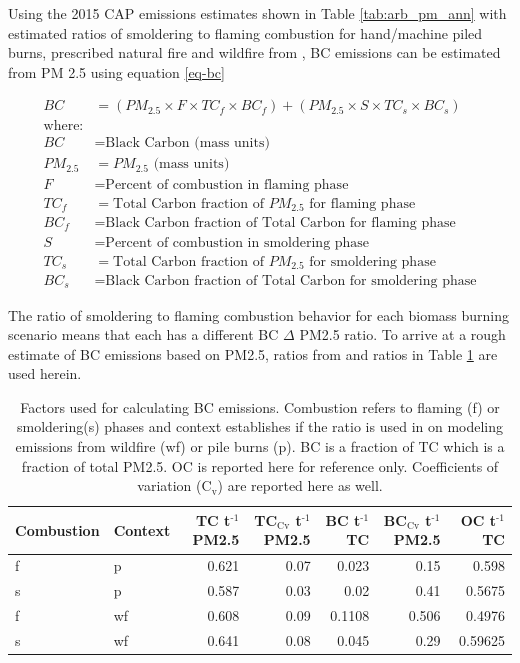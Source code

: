 \documentclass[a4paper]{article}
\begin{document}
Using the 2015 \ac{CAP} emissions estimates shown in Table \ref{tab:arb_pm_ann} with estimated ratios of smoldering to flaming combustion for hand/machine piled burns, prescribed natural fire and wildfire from \citet{Ward1989}, \ac{BC} emissions can be estimated from PM 2.5 using equation \eqref{eq-bc}


\begin{align}
BC &= \left( PM_{2.5} \times F \times TC_f \times BC_f\right) + \left( PM_{2.5} \times S \times TC_s \times BC_s\right) \label{eq-bc} \\
\text{where:} \nonumber \\
BC &= \text{Black Carbon (mass units)} \nonumber \\
PM_{2.5} &= PM_{2.5} \text{ (mass units)} \nonumber \\
F &= \text{Percent of combustion in flaming phase} \nonumber \\
TC_f &= \text{Total Carbon fraction of } PM_{2.5} \text{ for flaming phase} \nonumber \\
BC_f &= \text{Black Carbon fraction of Total Carbon for flaming phase} \nonumber \\
S &= \text{Percent of combustion in smoldering phase} \nonumber \\
TC_s &= \text{Total Carbon fraction of } PM_{2.5} \text{ for smoldering phase} \nonumber \\
BC_s &= \text{Black Carbon fraction of Total Carbon for smoldering phase} \nonumber
\end{align}

The ratio of smoldering to flaming combustion behavior for each biomass burning scenario means that each has a different \ac{BC} \(\Delta\) \ac{PM2.5}
ratio. To arrive at a rough estimate of \ac{BC} emissions based on PM2.5, ratios from  \citet{Ward1989} and \citet{Jenk1996} ratios in Table \ref{tab:bc_pm} are used herein.
\begin{table}[htb]
\centering
\begin{tabular}{llrrrrr}
Combustion & Context & TC t\(^{\text{-1}}\) \ac{PM2.5} & TC\(_{\text{Cv}}\) t\(^{\text{-1}}\) \ac{PM2.5} & BC t\(^{\text{-1}}\) TC & BC\(_{\text{Cv}}\) t\(^{\text{-1}}\) \ac{PM2.5} & OC t\(^{\text{-1}}\) TC\\
\hline
f & p & 0.621 & 0.07 & 0.023 & 0.15 & 0.598\\
s & p & 0.587 & 0.03 & 0.02 & 0.41 & 0.5675\\
f & wf & 0.608 & 0.09 & 0.1108 & 0.506 & 0.4976\\
s & wf & 0.641 & 0.08 & 0.045 & 0.29 & 0.59625\\
\end{tabular}
\caption{Factors used for calculating \ac{BC} emissions. Combustion refers to flaming (f) or smoldering(s) phases and context establishes if the ratio is used in on modeling emissions from wildfire (wf) or pile burns (p). \ac{BC} is a fraction of \ac{TC} which is a fraction of total \ac{PM2.5}. \ac{OC} is reported here for reference only. Coefficients of variation (C\(_{\text{v}}\)) are reported here as well. \label{tab:bc_pm}}

\end{table}
\end{document}
